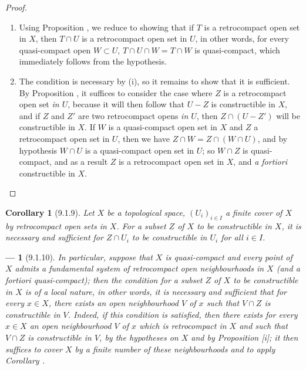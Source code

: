 \documentclass[oneside]{amsart}
\theoremstyle{ega-env-style}
\newtheorem*{env}{---}
\theoremstyle{ega-thm-env-style}
\newtheorem*{corollary}{Corollary}
\theoremstyle{ega-defn-env-style}
\def\setmin{-}                      %
\newcommand{\oldpage}[2][]{{\marginnote{\normalfont{\textbf{#1}~|~#2}}}\ignorespaces}
\let\EGAOriginalLabel\label
\renewcommand{\label}[1]{\phantomsection\EGAOriginalLabel{#1}}
\begin{document}
\begin{proof}
\medskip\noindent
\begin{enumerate}
  \item[(i)] Using Proposition , we reduce to showing that if $T$ is a retrocompact open set in $X$, then $T\cap U$ is a retrocompact open set in $U$, in other words, for every quasi-compact open $W\subset U$, $T\cap U\cap W=T\cap W$ is quasi-compact, which immediately follows from the hypothesis.
  \item[(ii)] The condition is necessary by (i), so it remains to show that it is sufficient.
    By Proposition , it suffices to consider the case where $Z$ is a retrocompact open set \emph{in $U$}, because it will then follow that $U\setmin Z$ is constructible in $X$, and if $Z$ and $Z'$ are two retrocompact opens \emph{in $U$}, then $Z\cap(U\setmin Z')$ will be constructible in $X$.
    If $W$ is a quasi-compact open set in $X$ and $Z$ a retrocompact open set in $U$, then we have $Z\cap W=Z\cap(W\cap U)$, and by hypothesis $W\cap U$ is a quasi-compact open set in $U$; so $W\cap Z$ is quasi-compact, and as a result $Z$ is a retrocompact open set in $X$, and \emph{a fortiori} constructible in $X$.
\end{enumerate}
\end{proof}

\begin{corollary}[9.1.9]
\label{0.9.1.9}
Let $X$ be a topological space, $(U_i)_{i\in I}$ a finite cover of $X$ by retrocompact open sets in $X$.
For a subset $Z$ of $X$ to be constructible in $X$, it is necessary and sufficient for $Z\cap U_i$ to be constructible in $U_i$ for all $i\in I$.
\end{corollary}

\begin{env}[9.1.10]
\label{0.9.1.10}
In particular, suppose that $X$ is quasi-compact and every point
\oldpage[0\textsubscript{III}]{14}
of $X$ admits a fundamental system of retrocompact open neighbourhoods in $X$ (and \emph{a fortiori} quasi-compact); then the condition for a subset $Z$ of $X$ to be constructible in $X$ is of a \emph{local} nature, in other words, it is necessary and sufficient that for every $x\in X$, there exists an open neighbourhood $V$ of $x$ such that $V\cap Z$ is constructible in $V$.
Indeed, if this condition is satisfied, then there exists for every $x\in X$ an open neighbourhood $V$ of $x$ which is \emph{retrocompact in $X$} and such that $V\cap Z$ is constructible in $V$, by the hypotheses on $X$ and by Proposition [i]; it then suffices to cover $X$ by a finite number of these neighbourhoods and to apply Corollary .
\end{env}
\end{document}
